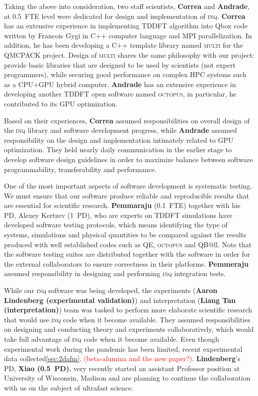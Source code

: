Taking the above into consideration, two staff scientists, {\bf Correa} and {\bf Andrade}, at 0.5~FTE level were dedicated for design and implementation of \textsc{inq}. 
{\bf Correa} has an extensive experience in implementing TDDFT algorithm into Qbox code written by Francois Gygi in C++ computer language and MPI parallelization. 
In addition, he has been developing a C++ template library named \textsc{multi} for the QMCPACK project.
Design of \textsc{multi} shares the same philosophy with our project: provide basic libraries that are designed to be used by scientists (not expert programmers), while securing good performance on complex HPC systems such as a CPU+GPU hybrid computer. 
{\bf Andrade} has an extensive experience in developing another TDDFT open software named \textsc{octopus}, in particular, he contributed to its GPU optimization.  

Based on their experiences, {\bf Correa} assumed responsibilities on overall design of the \textsc{inq} library and software development progress, while {\bf Andrade} assumed responsibility on the design and implementation intimately related to GPU optimization. 
They held nearly daily communication in the earlier stage to develop software design guidelines in order to maximize balance between software programmability, transferability and performance. 

One of the most important aspects of software development is systematic testing. 
We must ensure that our software produce reliable and reproducible results that are essential for scientific research. 
{\bf Pemmaraju} (0.1~FTE) together with his PD, Alexey Kertzev (1~PD), who are experts on TDDFT simulations have developed software testing protocols, which means identifying the type of systems, simulations and physical quantities to be compared against the results produced with well established codes such as QE, 
\textsc{octopus} and QB@ll. 
Note that the software testing suites are distributed together with the software in order for the external collaborators to ensure correctness in their platforms.
{\bf Pemmeraju} assumed responsibility in designing and performing \textsc{inq} integration tests.

While our \textsc{inq} software was being developed, the experiments ({\bf Aaron Lindenberg (experimental validation)}) and interpretation ({\bf Liang Tan (interpretation)}) team was tasked to perform more elaborate scientific research that would use \textsc{inq} code when it become available. 
They assumed responsibilities on designing and conducting theory and experiments collaboratively, which would take full advantage of \textsc{inq} code when it become available. Even though experimental work during the pandemic has been limited, recent experimental data collected\ref{sec:2dafm}. \textcolor{red}{(beta-alumina and the new paper?)}. 
{\bf Lindenberg}'s PD, {\bf Xiao (0.5~PD)}, very recently started an assistant Professor position at University of Wisconsin, Madison and are planning to continue the collaboration with us on the subject of ultrafast science.

